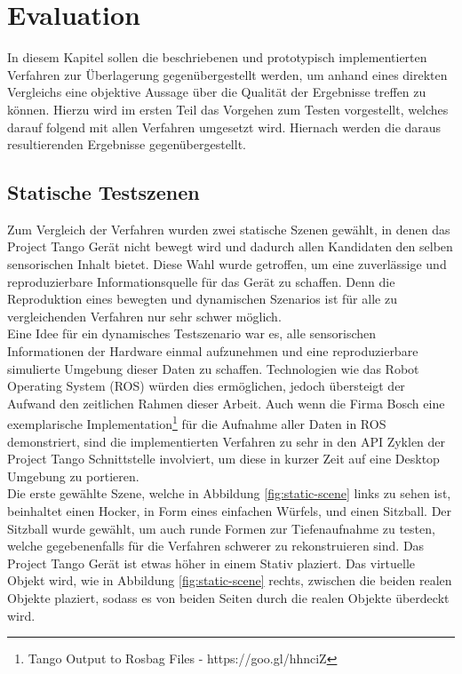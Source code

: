 \chapter{Evaluation} \label{sec:evaluation}

In diesem Kapitel sollen die beschriebenen und prototypisch implementierten Verfahren zur Überlagerung gegenübergestellt werden, um anhand eines direkten Vergleichs eine objektive Aussage über die Qualität der Ergebnisse treffen zu können. Hierzu wird im ersten Teil das Vorgehen zum Testen vorgestellt, welches darauf folgend mit allen Verfahren umgesetzt wird. Hiernach werden die daraus resultierenden Ergebnisse gegenübergestellt.

\section{Statische Testszenen}

Zum Vergleich der Verfahren wurden zwei statische Szenen gewählt, in denen das Project Tango Gerät nicht bewegt wird und dadurch allen Kandidaten den selben sensorischen Inhalt bietet. Diese Wahl wurde getroffen, um eine zuverlässige und reproduzierbare Informationsquelle für das Gerät zu schaffen. Denn die Reproduktion eines bewegten und dynamischen Szenarios ist für alle zu vergleichenden Verfahren nur sehr schwer möglich. \\

Eine Idee für ein dynamisches Testszenario war es, alle sensorischen Informationen der Hardware einmal aufzunehmen und eine reproduzierbare simulierte Umgebung dieser Daten zu schaffen. Technologien wie das Robot Operating System (ROS) würden dies ermöglichen, jedoch übersteigt der Aufwand den zeitlichen Rahmen dieser Arbeit. Auch wenn die Firma Bosch eine exemplarische Implementation\footnote{Tango Output to Rosbag Files - https://goo.gl/hhnciZ} für die Aufnahme aller Daten in ROS demonstriert, sind die implementierten Verfahren zu sehr in den API Zyklen der Project Tango Schnittstelle involviert, um diese in kurzer Zeit auf eine Desktop Umgebung zu portieren.\\

Die erste gewählte Szene, welche in Abbildung \ref{fig:static-scene} links zu sehen ist, beinhaltet einen Hocker, in Form eines einfachen  Würfels, und einen Sitzball. Der Sitzball wurde gewählt, um auch runde Formen zur Tiefenaufnahme zu testen, welche gegebenenfalls für die Verfahren schwerer zu rekonstruieren sind. Das Project Tango Gerät ist etwas höher in einem Stativ plaziert. Das virtuelle Objekt wird, wie in Abbildung \ref{fig:static-scene} rechts, zwischen die beiden realen Objekte plaziert, sodass es von beiden Seiten durch die realen Objekte überdeckt wird. \\

